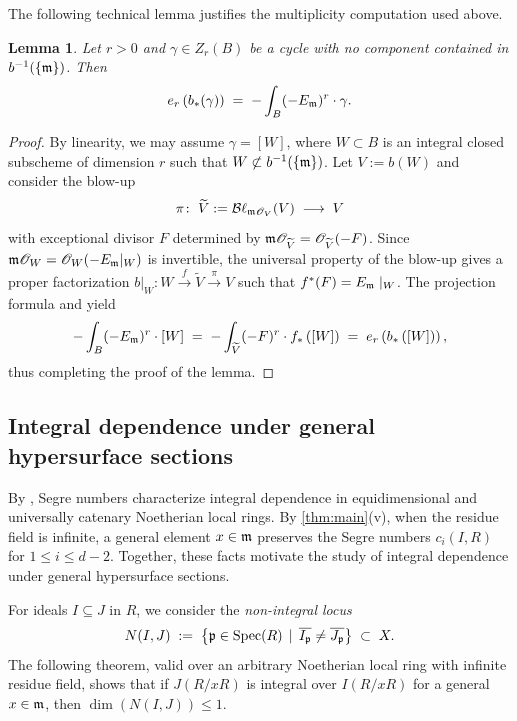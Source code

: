 \documentclass[a4paper, 11pt]{amsart}
\newcommand{\Bl}{{\mathcal{B}\ell}}
\newcommand{\mm}{{\normalfont\mathfrak{m}}}
\newcommand{\pp}{{\normalfont\mathfrak{p}}}
\newcommand{\OO}{\mathscr{O}}
\newcommand{\Spec}{\normalfont\text{Spec}}
\newtheorem{lemma}[lemma]{Lemma}
\theoremstyle{definition}
\begin{document}
	The following technical lemma justifies the multiplicity computation used above.
	\begin{lemma}
		\label{lem:cycle-multiplicity-transfer}
		Let $r>0$ and $\gamma\in Z_r(B)$ be a cycle with no component contained in $b^{-1}(\{\mm\})$. 
		Then
		$$
		e_r\left(b_*(\gamma)\right)\;=\; -\int_B (-E_\mm)^r \cdot\gamma.
		$$
	\end{lemma}
	\begin{proof}
		By linearity, we may assume $\gamma=[W]$, where $W\subset B$ is an integral closed subscheme of dimension $r$ such that  $W \not\subset b^{-1}(\{\mm\})$. 
		Let $V := b(W)$ and consider the blow-up
		$$
		\pi\colon \; \widetilde{V} :=\Bl_{\mm\OO_V}(V) \; \longrightarrow\; V
		$$
		with exceptional divisor $F$ determined by $\mm \OO_{\widetilde{V}} = \OO_{\widetilde{V}}(-F)$.
		Since
		$\mm\OO_W=\OO_W(-E_\mm|_W)$ is invertible, the universal property
		of the blow-up gives a proper factorization
		$
		b|_W\colon W \xrightarrow{f }\widetilde{V} \xrightarrow{ \pi } V
		$
		such that $f^*(F) = E_\mm\mid_W$.
		The projection formula and \cite[Theorem~3.1]{CutMon} yield
		$$
		-\int_B (-E_\mm)^r \cdot [W] \;=\; -\int_{\widetilde{V}} (-F)^r \cdot f_*\left([W]\right) \;=\; e_r\left(b_*\left([W]\right)\right),
		$$
		thus completing the proof of the lemma. 
	\end{proof}
	
	\subsection{Integral dependence under general hypersurface sections}
	\label{subsec:integral-dependence-general-sections}
	
	By \cite[Theorem~4.2]{PTUV}, Segre numbers characterize integral dependence in equidimensional and universally catenary Noetherian local rings.
	By \autoref{thm:main}(v), when the residue field is infinite, a general element $x\in\mm$ preserves the Segre numbers $c_i(I,R)$ for $1\leq i\leq d-2$.
	Together, these facts motivate the study of integral dependence under general hypersurface sections.
	
	For ideals $I\subseteq J$ in $R$, we consider the \emph{non-integral locus}
	$$
	N(I,J) \;:=\; \big\lbrace\pp\in \Spec(R) \,\mid\, \overline{I_\pp}\neq\overline{J_\pp} \big\rbrace \;\subset\; X.
	$$
	The following theorem, valid over an arbitrary Noetherian local ring with infinite residue field, shows that if $J(R/xR)$ is integral over $I(R/xR)$ for a general $x\in\mm$, then $\dim(N(I,J))\leq1$.
	
\end{document}
